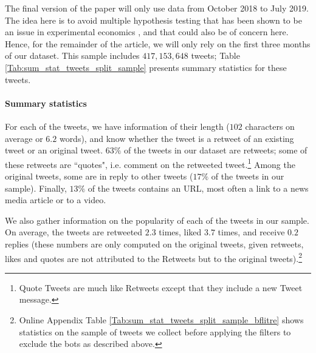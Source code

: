 The final version of the paper will only use data from October 2018 to July 2019. The idea here is to avoid multiple hypothesis testing that has been shown to be an issue in experimental economics \citep{ListShaikhXu2019}, and that could also be of concern here. Hence, for the remainder of the article, we will only rely on the first three months of our dataset. This sample includes $417,153,648$ tweets; Table \ref{Tab:sum_stat_tweets_split_sample} presents summary statistics for these tweets. 


\paragraph{Summary statistics}

For each of the tweets, we have information of their length ($102$ characters on average or $6.2$ words), and know whether the tweet is a retweet of an existing tweet or an original tweet. $63\%$ of the tweets in our dataset are retweets; some of these retweets are ``quotes", i.e. comment on the retweeted tweet.\footnote{Quote Tweets are much like Retweets except that they include a new Tweet message.} Among the original tweets, some are in reply to other tweets ($17\%$ of the tweets in our sample). Finally, $13\%$ of the tweets contains an URL, most often a link to a news media article or to a video.

We also gather information on the popularity of each of the tweets in our sample. On average, the tweets are retweeted $2.3$ times, liked $3.7$ times, and receive $0.2$ replies (these numbers are only computed on the original tweets, given retweets, likes and quotes are not attributed to the Retweets but to the original tweets).\footnote{Online Appendix Table \ref{Tab:sum_stat_tweets_split_sample_bflitre} shows statistics on the sample of tweets we collect before applying the filters to exclude the bots as described above.} 


